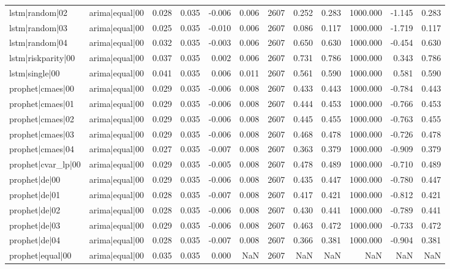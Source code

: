 \begin{table}
\begin{tabular}{llrrrrrrrrrr}
lstm|random|02 & arima|equal|00 & 0.028 & 0.035 & -0.006 & 0.006 & 2607 & 0.252 & 0.283 & 1000.000 & -1.145 & 0.283 \\
lstm|random|03 & arima|equal|00 & 0.025 & 0.035 & -0.010 & 0.006 & 2607 & 0.086 & 0.117 & 1000.000 & -1.719 & 0.117 \\
lstm|random|04 & arima|equal|00 & 0.032 & 0.035 & -0.003 & 0.006 & 2607 & 0.650 & 0.630 & 1000.000 & -0.454 & 0.630 \\
lstm|riskparity|00 & arima|equal|00 & 0.037 & 0.035 & 0.002 & 0.006 & 2607 & 0.731 & 0.786 & 1000.000 & 0.343 & 0.786 \\
lstm|single|00 & arima|equal|00 & 0.041 & 0.035 & 0.006 & 0.011 & 2607 & 0.561 & 0.590 & 1000.000 & 0.581 & 0.590 \\
prophet|cmaes|00 & arima|equal|00 & 0.029 & 0.035 & -0.006 & 0.008 & 2607 & 0.433 & 0.443 & 1000.000 & -0.784 & 0.443 \\
prophet|cmaes|01 & arima|equal|00 & 0.029 & 0.035 & -0.006 & 0.008 & 2607 & 0.444 & 0.453 & 1000.000 & -0.766 & 0.453 \\
prophet|cmaes|02 & arima|equal|00 & 0.029 & 0.035 & -0.006 & 0.008 & 2607 & 0.445 & 0.455 & 1000.000 & -0.763 & 0.455 \\
prophet|cmaes|03 & arima|equal|00 & 0.029 & 0.035 & -0.006 & 0.008 & 2607 & 0.468 & 0.478 & 1000.000 & -0.726 & 0.478 \\
prophet|cmaes|04 & arima|equal|00 & 0.027 & 0.035 & -0.007 & 0.008 & 2607 & 0.363 & 0.379 & 1000.000 & -0.909 & 0.379 \\
prophet|cvar\_lp|00 & arima|equal|00 & 0.029 & 0.035 & -0.005 & 0.008 & 2607 & 0.478 & 0.489 & 1000.000 & -0.710 & 0.489 \\
prophet|de|00 & arima|equal|00 & 0.029 & 0.035 & -0.006 & 0.008 & 2607 & 0.435 & 0.447 & 1000.000 & -0.780 & 0.447 \\
prophet|de|01 & arima|equal|00 & 0.028 & 0.035 & -0.007 & 0.008 & 2607 & 0.417 & 0.421 & 1000.000 & -0.812 & 0.421 \\
prophet|de|02 & arima|equal|00 & 0.028 & 0.035 & -0.006 & 0.008 & 2607 & 0.430 & 0.441 & 1000.000 & -0.789 & 0.441 \\
prophet|de|03 & arima|equal|00 & 0.029 & 0.035 & -0.006 & 0.008 & 2607 & 0.463 & 0.472 & 1000.000 & -0.733 & 0.472 \\
prophet|de|04 & arima|equal|00 & 0.028 & 0.035 & -0.007 & 0.008 & 2607 & 0.366 & 0.381 & 1000.000 & -0.904 & 0.381 \\
prophet|equal|00 & arima|equal|00 & 0.035 & 0.035 & 0.000 & NaN & 2607 & NaN & NaN & NaN & NaN & NaN \\

\end{tabular}
\end{table}
